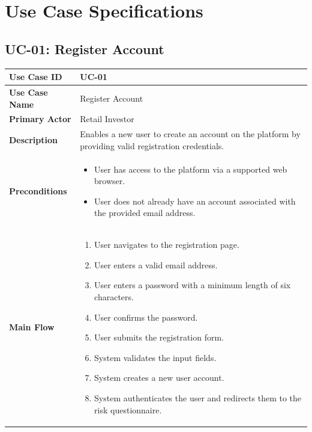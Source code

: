 \chapter{Use Case Specifications}
\label{appendix:use-cases}

\renewcommand{\arraystretch}{1.0} %

\section{UC-01: Register Account}
\label{uc:register}

\begin{longtable}{|>{\raggedright\arraybackslash\bfseries}p{3.5cm}|p{11cm}|}
\hline
\rowcolor{gray!15} Use Case ID & UC-01 \\ \hline
Use Case Name & Register Account \\ \hline
Primary Actor & Retail Investor \\ \hline
Description & Enables a new user to create an account on the platform by providing valid registration credentials. \\ \hline
Preconditions &
\begin{itemize}[leftmargin=*, nosep]
    \item User has access to the platform via a supported web browser.
    \item User does not already have an account associated with the provided email address.
\end{itemize} \\ \hline
Main Flow &
\begin{enumerate}[leftmargin=*, nosep]
    \item User navigates to the registration page.
    \item User enters a valid email address.
    \item User enters a password with a minimum length of six characters.
    \item User confirms the password.
    \item User submits the registration form.
    \item System validates the input fields.
    \item System creates a new user account.
    \item System authenticates the user and redirects them to the risk questionnaire.
\end{enumerate} \\ \hline

\end{longtable}
